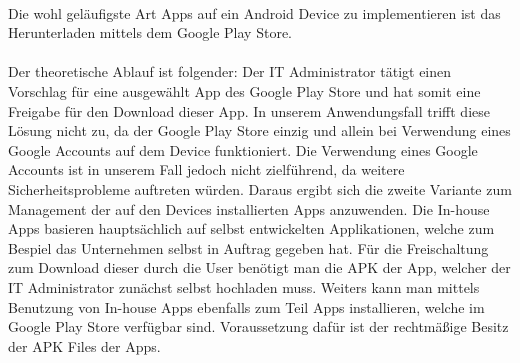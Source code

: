 \paragraph*{}
Die wohl geläufigste Art Apps auf ein Android Device zu implementieren ist das Herunterladen mittels dem Google Play Store.
\paragraph*{}
Der theoretische Ablauf ist folgender: Der IT Administrator tätigt einen Vorschlag für eine ausgewählt App des Google Play Store und hat somit eine Freigabe für den Download dieser App. In unserem Anwendungsfall trifft diese Lösung nicht zu, da der Google Play Store einzig und allein bei Verwendung eines Google Accounts auf dem Device funktioniert. Die Verwendung eines Google Accounts ist in unserem Fall jedoch nicht zielführend, da weitere Sicherheitsprobleme auftreten würden. Daraus ergibt sich die zweite Variante zum Management der auf den Devices installierten Apps anzuwenden. Die In-house Apps basieren hauptsächlich auf selbst entwickelten Applikationen, welche zum Bespiel das Unternehmen selbst in Auftrag gegeben hat. Für die Freischaltung zum Download dieser durch die User benötigt man die APK der App, welcher der IT Administrator zunächst selbst hochladen muss. Weiters kann man mittels Benutzung von In-house Apps ebenfalls zum Teil Apps installieren, welche im Google Play Store verfügbar sind. Voraussetzung dafür ist der rechtmäßige Besitz der APK Files der Apps.

